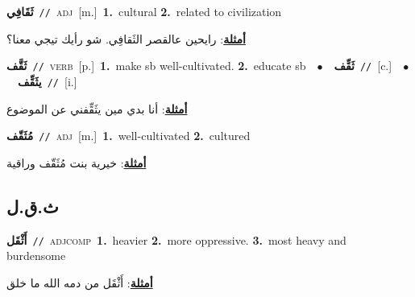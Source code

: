 \documentclass[10pt,a4paper,twoside]{article} %
\begin{document}
\begin{multicols}{2}
{\setlength\topsep{0pt}\textbf{\foreignlanguage{arabic}{ثَقَافِي}}\ {\color{gray}\texttt{//}\color{black}}\ \textsc{adj}\ [m.]\ \textbf{1.}~cultural  \textbf{2.}~related to civilization\  \begin{flushright}\color{gray}\foreignlanguage{arabic}{\textbf{\underline{\foreignlanguage{arabic}{أمثلة}}}: رايحين عالقصر الثَقافِي. شو رأيك تيجي معنا؟}\end{flushright}\color{black}} \vspace{2mm}

{\setlength\topsep{0pt}\textbf{\foreignlanguage{arabic}{ثَقَّف}}\ {\color{gray}\texttt{//}\color{black}}\ \textsc{verb}\ [p.]\ \textbf{1.}~make sb well-cultivated.  \textbf{2.}~educate sb\ \ $\bullet$\ \ \setlength\topsep{0pt}\textbf{\foreignlanguage{arabic}{ثَقِّف}}\ {\color{gray}\texttt{//}\color{black}}\ [c.]\ \ $\bullet$\ \ \setlength\topsep{0pt}\textbf{\foreignlanguage{arabic}{يثَقِّف}}\ {\color{gray}\texttt{//}\color{black}}\ [i.]\  \begin{flushright}\color{gray}\foreignlanguage{arabic}{\textbf{\underline{\foreignlanguage{arabic}{أمثلة}}}: أنا بدي مين يثَقِّفني عن الموضوع}\end{flushright}\color{black}} \vspace{2mm}

{\setlength\topsep{0pt}\textbf{\foreignlanguage{arabic}{مُثَقّف}}\ {\color{gray}\texttt{//}\color{black}}\ \textsc{adj}\ [m.]\ \textbf{1.}~well-cultivated  \textbf{2.}~cultured\  \begin{flushright}\color{gray}\foreignlanguage{arabic}{\textbf{\underline{\foreignlanguage{arabic}{أمثلة}}}: خيرية بنت مُثَقّف وراقية}\end{flushright}\color{black}} \vspace{2mm}

\vspace{-3mm}
\subsection*{\color{blue}\foreignlanguage{arabic}{ث.ق.ل}\color{blue}{}} 

{\setlength\topsep{0pt}\textbf{\foreignlanguage{arabic}{أَثْقَل}}\ {\color{gray}\texttt{//}\color{black}}\ \textsc{adj\textunderscore comp}\ \textbf{1.}~heavier  \textbf{2.}~more oppressive.  \textbf{3.}~most heavy and burdensome\  \begin{flushright}\color{gray}\foreignlanguage{arabic}{\textbf{\underline{\foreignlanguage{arabic}{أمثلة}}}: أَثْقَل من دمه الله ما خلق}\end{flushright}\color{black}} \vspace{2mm}


\end{multicols}
\end{document}
